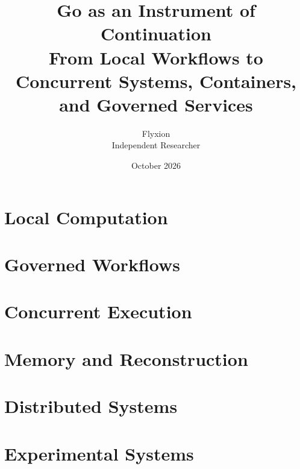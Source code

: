 \documentclass[11pt,twoside]{book}
\title{\textbf{Go as an Instrument of Continuation}\\[0.6em]
\large From Local Workflows to Concurrent Systems, Containers, and Governed Services}
\author{Flyxion\\Independent Researcher}
\date{October 2026}
\theoremstyle{plain}
\theoremstyle{definition}
\theoremstyle{remark}
\begin{document}
\frontmatter
\maketitle
\tableofcontents



\mainmatter

\part{Local Computation}







\part{Governed Workflows}




\part{Concurrent Execution}




\part{Memory and Reconstruction}




\part{Distributed Systems}




\part{Experimental Systems}







\appendix

\end{document}
